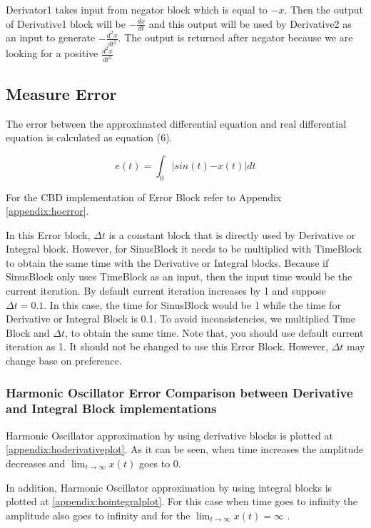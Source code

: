\documentclass{article}
\begin{document}
Derivator1 takes input from negator block which is equal to $-x$. Then the output of Derivative1 block will be $-\frac{dx}{dt}$ and this output will be used by Derivative2 as an input to generate $-\frac{d^2 x}{dt^2}$. The output is returned after negator because we are looking for a positive $\frac{d^2 x}{dt^2}$  

\subsection{Measure Error}
The error between the approximated differential equation and real differential equation is calculated as equation (6).

\begin{equation}
e(t) =   \int_0|sin(t){-x(t)}|dt
\end{equation}

For the CBD implementation of Error Block  refer to Appendix \ref{appendix:hoerror}.

In this Error block, $\Delta t$ is a constant block that is directly used by Derivative or Integral block. However, for SinusBlock it needs to be multiplied with TimeBlock to obtain the same time with the Derivative or Integral blocks. Because if SinusBlock only uses TimeBlock as an input, then the input time would be the current iteration. By default current iteration increases by 1 and suppose $\Delta t = 0.1$. In this case, the time for SinusBlock would be 1 while the time for Derivative or Integral Block is 0.1. To avoid inconsistencies, we multiplied Time Block and $\Delta t$, to obtain the same time. Note that, you should use default current iteration as 1. It should not be changed to use this Error Block. However, $\Delta t$ may change base on preference.
\newpage
\subsubsection{Harmonic Oscillator Error Comparison between Derivative and Integral Block implementations}

Harmonic Oscillator approximation by using derivative blocks is plotted at  \ref{appendix:hoderivativeplot}. As it can be seen, when time increases the amplitude decreases and $\lim_{t\to\infty} x(t)$ goes to 0. 


In addition, Harmonic Oscillator approximation by using integral blocks is plotted at  \ref{appendix:hointegralplot}. For this case when time goes to infinity the amplitude also goes to infinity and for the $\lim_{t\to\infty} x(t) = \infty$ . 
\end{document}
